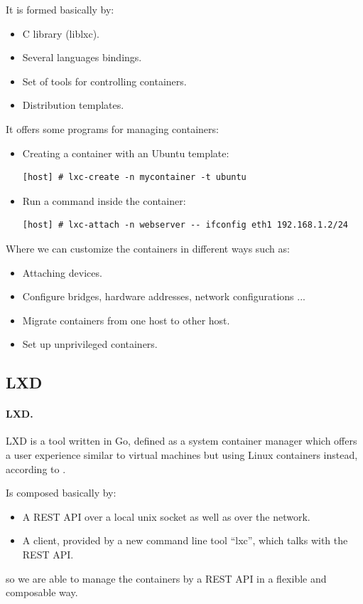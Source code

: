 It is formed basically by:
\begin{itemize}
	\item{C library (liblxc).}
	\item{Several languages bindings.}
	\item{Set of tools for controlling containers.}
	\item{Distribution templates.}
\end{itemize}

It offers some programs for managing containers:
\begin{itemize}
	\item{Creating a container with an Ubuntu template}:
	      \begin{verbatim}
[host] # lxc-create -n mycontainer -t ubuntu
	\end{verbatim}
	\item{Run a command inside the container:}
	      \begin{verbatim}
[host] # lxc-attach -n webserver -- ifconfig eth1 192.168.1.2/24
	\end{verbatim}
\end{itemize}

Where we can customize the containers in different ways such as:
\begin{itemize}
	\item{Attaching devices.}
	\item{Configure bridges, hardware addresses, network configurations ...}
	\item{Migrate containers from one host to other host.}
	\item{Set up unprivileged containers.}
\end{itemize}

\subsection{LXD}
\paragraph{LXD.} LXD is a tool written in Go, defined as a system container manager which offers a user experience similar to virtual machines but using Linux containers instead, according to \cite{lxd}.

Is composed basically by:
\begin{itemize}
	\item{A REST API over a local unix socket as well as over the network.}
	\item{A client, provided by a new command line tool ``lxc'', which talks with the REST API.}
\end{itemize}
so we are able to manage the containers by a REST API in a flexible and composable way.

